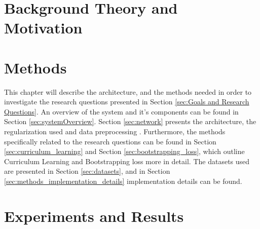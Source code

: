 \documentclass[a4paper]{book}
\begin{document}












\chapter{Background Theory and Motivation}\label{T-B}
\label{cha:TheoryAndBackground}











\chapter{Methods}
\label{cha:architectureAndModel}
This chapter will describe the architecture, and the methods needed in order to investigate the research questions presented in Section \ref{sec:Goals and Research Questions}. An overview of the system and it's components can be found in Section \ref{sec:systemOverview}. Section \ref{sec:network} presents the architecture, the regularization used and data preprocessing . Furthermore, the methods specifically related to the research questions can be found in Section \ref{sec:curriculum_learning} and Section \ref{sec:bootstrapping_loss}, which outline Curriculum Learning and Bootstrapping loss more in detail. The datasets used are presented in Section \ref{sec:datasets}, and in Section \ref{sec:methods_implementation_details} implementation details can be found.














\chapter{Experiments and Results}
\label{cha:ResearchAndResults}
\end{document}
